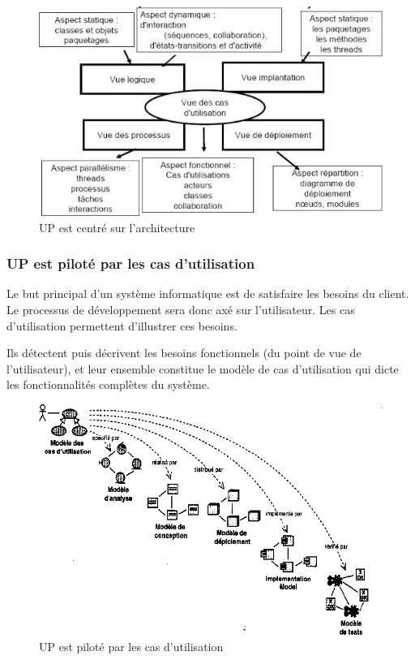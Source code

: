 \documentclass[12pt,a4paper]{report}
\begin{document}
\begin{figure}[H]
	\centering
	\includegraphics[width=0.8\linewidth]{image28.png}
	\caption{UP est centr\'{e} sur l'architecture}
	
\end{figure}


\noindent \begin{flushleft}
	
\end{flushleft}


\subsubsection{ UP est pilot\'{e} par les cas d'utilisation}

\noindent \begin{flushleft}
	Le but principal d'un syst\`{e}me informatique est de satisfaire les besoins du client. Le processus de d\'{e}veloppement sera donc ax\'{e} sur l'utilisateur. Les cas d'utilisation permettent d'illustrer ces besoins.
	
	\noindent Ils d\'{e}tectent puis d\'{e}crivent les besoins fonctionnels (du point de vue de l'utilisateur), et leur ensemble constitue le mod\`{e}le de cas d'utilisation qui dicte les fonctionnalit\'{e}s compl\`{e}tes du syst\`{e}me.
\end{flushleft}


\begin{figure}[H]
	\centering
	\includegraphics[width=0.8\linewidth]{image29.png}
	\caption{UP est pilot\'{e} par les cas d'utilisation}
	
\end{figure}
\end{document}

